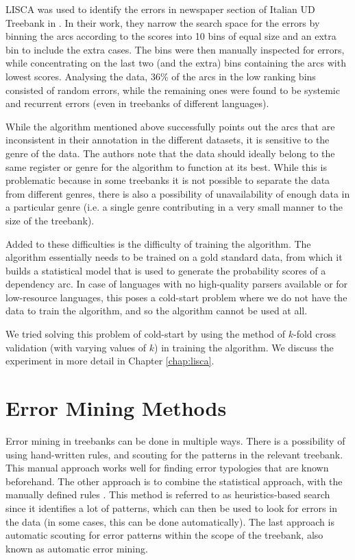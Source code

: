 LISCA was used to identify the errors in newspaper section of Italian UD Treebank in \cite{alzetta2017dangerous}. In their work, they narrow the search space for the errors by binning the arcs according to the scores into 10 bins of equal size and an extra bin to include the extra cases. The bins were then manually inspected for errors, while concentrating on the last two (and the extra) bins containing the arcs with lowest scores. Analysing the data, 36\% of the arcs in the low ranking bins consisted of random errors, while the remaining ones were found to be systemic and recurrent errors (even in treebanks of different languages).

While the algorithm mentioned above successfully points out the arcs that are inconsistent in their annotation in the different datasets, it is sensitive to the genre of the data. The authors note that the data should ideally belong to the same register or genre for the algorithm to function at its best. While this is problematic because in some treebanks it is not possible to separate the data from different genres, there is also a possibility of unavailability of enough data in a particular genre (i.e. a single genre contributing in a very small manner to the size of the treebank).

Added to these difficulties is the difficulty of training the algorithm. The algorithm essentially needs to be trained on a gold standard data, from which it builds a statistical model that is used to generate the probability scores of a dependency arc. In case of languages with no high-quality parsers available or for low-resource languages, this poses a cold-start problem where we do not have the data to train the algorithm, and so the algorithm cannot be used at all.

We tried solving this problem of cold-start by using the method of \(k\)-fold cross validation (with varying values of \(k\)) in training the algorithm. We discuss the experiment in more detail in Chapter \ref{chap:lisca}.

\section{Error Mining Methods}
\label{sec:error-mining}

Error mining in treebanks can be done in multiple ways. There is a possibility of using hand-written rules, and scouting for the patterns in the relevant treebank. This manual approach works well for finding error typologies that are known beforehand. The other approach is to combine the statistical approach, with the manually defined rules \citep{ambati}. This method is referred to as heuristics-based search since it identifies a lot of patterns, which can then be used to look for errors in the data (in some cases, this can be done automatically). The last approach is automatic scouting for error patterns within the scope of the treebank, also known as automatic error mining.

